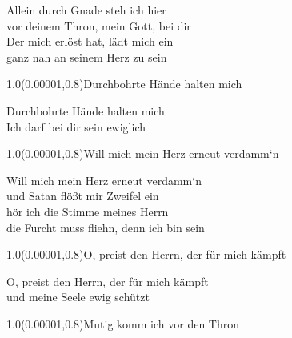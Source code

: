 \documentclass[aspectratio=169]{beamer}
\begin{document}
\color{white}
\begin{frame}
\centering
\color{white}
\huge{Allein durch Gnade steh ich hier} \\
\huge{vor deinem Thron, mein Gott, bei dir} \\
\huge{Der mich erlöst hat, lädt mich ein} \\
\huge{ganz nah an seinem Herz zu sein} \\

\begin{textblock}{1.0}(0.00001,0.8)\color{gray}\normalsize{Durchbohrte Hände halten mich}\end{textblock}
\end{frame}

\begin{frame}
\centering
\color{white}
\huge{Durchbohrte Hände halten mich} \\
\huge{Ich darf bei dir sein ewiglich} \\

\begin{textblock}{1.0}(0.00001,0.8)\color{gray}\normalsize{Will mich mein Herz erneut verdamm‘n}\end{textblock}
\end{frame}

\begin{frame}
\centering
\color{white}
\huge{Will mich mein Herz erneut verdamm‘n} \\
\huge{und Satan flößt mir Zweifel ein} \\
\huge{hör ich die Stimme meines Herrn} \\
\huge{die Furcht muss fliehn, denn ich bin sein} \\

\begin{textblock}{1.0}(0.00001,0.8)\color{gray}\normalsize{O, preist den Herrn, der für mich kämpft}\end{textblock}
\end{frame}

\begin{frame}
\centering
\color{white}
\huge{O, preist den Herrn, der für mich kämpft} \\
\huge{und meine Seele ewig schützt} \\

\begin{textblock}{1.0}(0.00001,0.8)\color{gray}\normalsize{Mutig komm ich vor den Thron}\end{textblock}
\end{frame}
\end{document}
